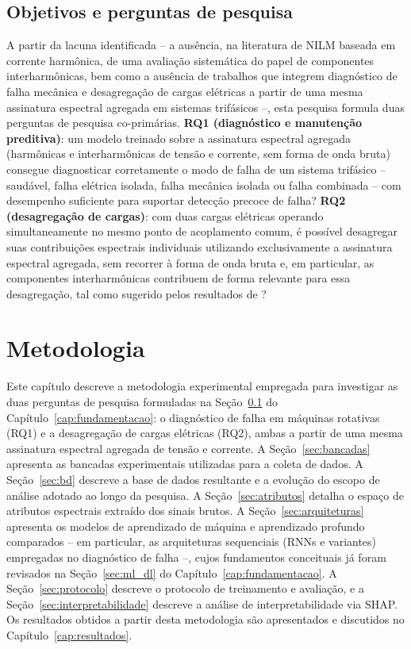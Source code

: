 \documentclass[times,final]{elsarticle}
\begin{document}
\subsection{Objetivos e perguntas de pesquisa}
\label{sec:objetivos}
A partir da lacuna identificada -- a ausência, na literatura de NILM baseada em corrente harmônica, de uma avaliação sistemática do papel de componentes interharmônicas, bem como a ausência de trabalhos que integrem diagnóstico de falha mecânica e desagregação de cargas elétricas a partir de uma mesma assinatura espectral agregada em sistemas trifásicos --, esta pesquisa formula duas perguntas de pesquisa co-primárias.
\textbf{RQ1 (diagnóstico e manutenção preditiva)}: um modelo treinado sobre a assinatura espectral agregada (harmônicas e interharmônicas de tensão e corrente, sem forma de onda bruta) consegue diagnosticar corretamente o modo de falha de um sistema trifásico -- saudável, falha elétrica isolada, falha mecânica isolada ou falha combinada -- com desempenho suficiente para suportar detecção precoce de falha?
\textbf{RQ2 (desagregação de cargas)}: com duas cargas elétricas operando simultaneamente no mesmo ponto de acoplamento comum, é possível desagregar suas contribuições espectrais individuais utilizando exclusivamente a assinatura espectral agregada, sem recorrer à forma de onda bruta e, em particular, as componentes interharmônicas contribuem de forma relevante para essa desagregação, tal como sugerido pelos resultados de \citet{efe2016}?
\section{Metodologia}
\label{cap:metodologia}
Este capítulo descreve a metodologia experimental empregada para investigar as duas perguntas de pesquisa formuladas na Seção~\ref{sec:objetivos} do Capítulo~\ref{cap:fundamentacao}: o diagnóstico de falha em máquinas rotativas (RQ1) e a desagregação de cargas elétricas (RQ2), ambas a partir de uma mesma assinatura espectral agregada de tensão e corrente. A Seção~\ref{sec:bancadas} apresenta as bancadas experimentais utilizadas para a coleta de dados. A Seção~\ref{sec:bd} descreve a base de dados resultante e a evolução do escopo de análise adotado ao longo da pesquisa. A Seção~\ref{sec:atributos} detalha o espaço de atributos espectrais extraído dos sinais brutos. A Seção~\ref{sec:arquiteturas} apresenta os modelos de aprendizado de máquina e aprendizado profundo comparados -- em particular, as arquiteturas sequenciais (RNNs e variantes) empregadas no diagnóstico de falha --, cujos fundamentos conceituais já foram revisados na Seção~\ref{sec:ml_dl} do Capítulo~\ref{cap:fundamentacao}. A Seção~\ref{sec:protocolo} descreve o protocolo de treinamento e avaliação, e a Seção~\ref{sec:interpretabilidade} descreve a análise de interpretabilidade via SHAP. Os resultados obtidos a partir desta metodologia são apresentados e discutidos no Capítulo~\ref{cap:resultados}.
\end{document}
